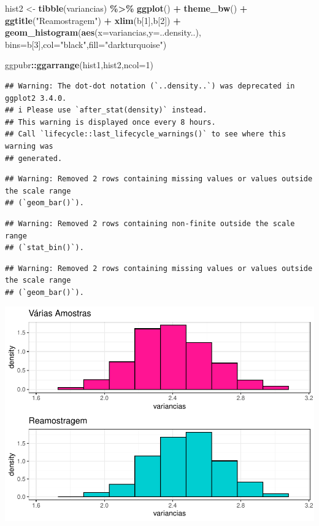 \documentclass[
]{book}
\newenvironment{Shaded}{\begin{snugshade}}{\end{snugshade}}
\newcommand{\AttributeTok}[1]{\textcolor[rgb]{0.13,0.29,0.53}{#1}}
\newcommand{\DecValTok}[1]{\textcolor[rgb]{0.00,0.00,0.81}{#1}}
\newcommand{\FunctionTok}[1]{\textcolor[rgb]{0.13,0.29,0.53}{\textbf{#1}}}
\newcommand{\NormalTok}[1]{#1}
\newcommand{\OtherTok}[1]{\textcolor[rgb]{0.56,0.35,0.01}{#1}}
\newcommand{\SpecialCharTok}[1]{\textcolor[rgb]{0.81,0.36,0.00}{\textbf{#1}}}
\newcommand{\StringTok}[1]{\textcolor[rgb]{0.31,0.60,0.02}{#1}}
\begin{document}
\begin{Shaded}
\begin{Highlighting}[]
\NormalTok{hist2 }\OtherTok{\textless{}{-}} \FunctionTok{tibble}\NormalTok{(variancias) }\SpecialCharTok{\%\textgreater{}\%} \FunctionTok{ggplot}\NormalTok{() }\SpecialCharTok{+} \FunctionTok{theme\_bw}\NormalTok{() }\SpecialCharTok{+} 
  \FunctionTok{ggtitle}\NormalTok{(}\StringTok{"Reamostragem"}\NormalTok{) }\SpecialCharTok{+} \FunctionTok{xlim}\NormalTok{(b[}\DecValTok{1}\NormalTok{],b[}\DecValTok{2}\NormalTok{]) }\SpecialCharTok{+}
  \FunctionTok{geom\_histogram}\NormalTok{(}\FunctionTok{aes}\NormalTok{(}\AttributeTok{x=}\NormalTok{variancias,}\AttributeTok{y=}\NormalTok{..density..),}
      \AttributeTok{bins=}\NormalTok{b[}\DecValTok{3}\NormalTok{],}\AttributeTok{col=}\StringTok{"black"}\NormalTok{,}\AttributeTok{fill=}\StringTok{"darkturquoise"}\NormalTok{)}

\NormalTok{ggpubr}\SpecialCharTok{::}\FunctionTok{ggarrange}\NormalTok{(hist1,hist2,}\AttributeTok{ncol=}\DecValTok{1}\NormalTok{)}
\end{Highlighting}
\end{Shaded}

\begin{verbatim}
## Warning: The dot-dot notation (`..density..`) was deprecated in ggplot2 3.4.0.
## i Please use `after_stat(density)` instead.
## This warning is displayed once every 8 hours.
## Call `lifecycle::last_lifecycle_warnings()` to see where this warning was
## generated.
\end{verbatim}

\begin{verbatim}
## Warning: Removed 2 rows containing missing values or values outside the scale range
## (`geom_bar()`).
\end{verbatim}

\begin{verbatim}
## Warning: Removed 2 rows containing non-finite outside the scale range
## (`stat_bin()`).
\end{verbatim}

\begin{verbatim}
## Warning: Removed 2 rows containing missing values or values outside the scale range
## (`geom_bar()`).
\end{verbatim}

\begin{center}\includegraphics{AED_files/figure-latex/reamostragem-1} \end{center}
\end{document}
